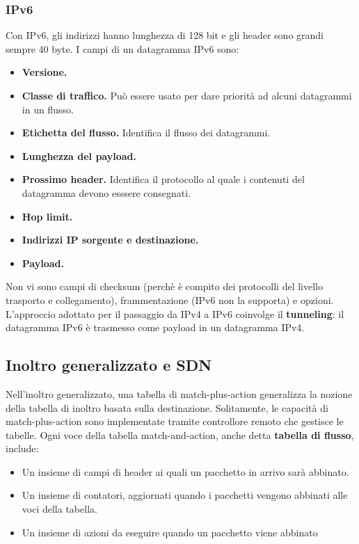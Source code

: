 \documentclass[11pt]{article}
\begin{document}
\subsubsection{IPv6}
Con IPv6, gli indirizzi hanno lunghezza di 128 bit e gli header sono grandi sempre 40 byte. I campi di un datagramma IPv6 
sono:
\begin{itemize}
    \item \textbf{Versione.} 
    \item \textbf{Classe di traffico.} Può essere usato per dare priorità ad alcuni datagrammi in un flusso.
    \item \textbf{Etichetta del flusso.} Identifica il flusso dei datagrammi.
    \item \textbf{Lunghezza del payload.}
    \item \textbf{Prossimo header.} Identifica il protocollo al quale i contenuti del datagramma devono esssere consegnati.
    \item \textbf{Hop limit.}
    \item \textbf{Indirizzi IP sorgente e destinazione.}
    \item \textbf{Payload.}
\end{itemize}
Non vi sono campi di checksum (perchè è compito dei protocolli del livello trasporto e collegamento), frammentazione (IPv6 
non la supporta) e opzioni.\\
L'approccio adottato per il passaggio da IPv4 a IPv6 coinvolge il \textbf{tunneling}: il datagramma IPv6 è trasmesso come 
payload in un datagramma IPv4. 
\subsection{Inoltro generalizzato e SDN}
Nell'inoltro generalizzato, una tabella di match-plus-action generalizza la nozione della tabella di inoltro basata sulla 
destinazione. Solitamente, le capacità di match-plus-action sono implementate tramite controllore remoto che gestisce le 
tabelle. Ogni voce della tabella match-and-action, anche detta \textbf{tabella di flusso}, include:
\begin{itemize}
    \item Un insieme di campi di header ai quali un pacchetto in arrivo sarà abbinato.
    \item Un insieme di contatori, aggiornati quando i pacchetti vengono abbinati alle voci della tabella.
    \item Un insieme di azioni da eseguire quando un pacchetto viene abbinato
\end{itemize}
\end{document}
